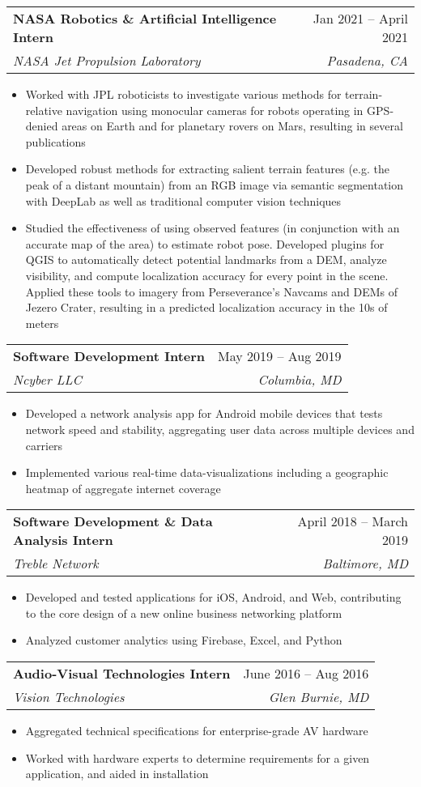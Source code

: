 \documentclass[letterpaper,11pt]{article}
\makeatletter
\newcommand{\resumeItem}[1]{
  \item\small{
    {#1 \vspace{-2pt}}
  }
}
\newcommand{\resumeSubheading}[4]{
  \vspace{-2pt}\item
    \begin{tabular*}{0.97\textwidth}[t]{l@{\extracolsep{\fill}}r}
      \textbf{#1} & #2 \\
      \textit{\small#3} & \textit{\small #4} \\
    \end{tabular*}\vspace{-7pt}
}
\newcommand{\resumeItemListStart}{\begin{itemize}}
\newcommand{\resumeItemListEnd}{\end{itemize}}
\makeatother
\begin{document}
    \resumeSubheading
      {NASA Robotics \& Artificial Intelligence Intern}{Jan 2021 -- April 2021}
      {NASA Jet Propulsion Laboratory}{Pasadena, CA}
      \resumeItemListStart
        \resumeItem{Worked with JPL roboticists to investigate various methods for terrain-relative navigation using monocular cameras for robots operating in GPS-denied areas on Earth and for planetary rovers on Mars, resulting in several publications}
        \resumeItem{Developed robust methods for extracting salient terrain features (e.g. the peak of a distant mountain) from an RGB image via semantic segmentation with DeepLab as well as traditional computer vision techniques}
        \resumeItem{Studied the effectiveness of using observed features (in conjunction with an accurate map of the area) to estimate robot pose. Developed plugins for QGIS to automatically detect potential landmarks from a DEM, analyze visibility, and compute localization accuracy for every point in the scene. Applied these tools to imagery from Perseverance's Navcams and DEMs of Jezero Crater, resulting in a predicted localization accuracy in the 10s of meters}
      \resumeItemListEnd
  
    \resumeSubheading
      {Software Development Intern}{May 2019 -- Aug 2019}
      {Ncyber LLC}{Columbia, MD}
      \resumeItemListStart
        \resumeItem{Developed a network analysis app for Android mobile devices that tests network speed and stability, aggregating user data across multiple devices and carriers}
        \resumeItem{Implemented various real-time data-visualizations including a geographic heatmap of aggregate internet coverage}
      \resumeItemListEnd
      
      \resumeSubheading
      {Software Development \& Data Analysis Intern}{April 2018 -- March 2019}
      {Treble Network}{Baltimore, MD}
      \resumeItemListStart
        \resumeItem{Developed and tested applications for iOS, Android, and Web, contributing to the core design of a new online business networking platform}
        \resumeItem{Analyzed customer analytics using Firebase, Excel, and Python}
      \resumeItemListEnd
      
      \resumeSubheading
      {Audio-Visual Technologies Intern}{June 2016 -- Aug 2016}
      {Vision Technologies}{Glen Burnie, MD}
      \resumeItemListStart
        \resumeItem{Aggregated technical specifications for enterprise-grade AV hardware}
        \resumeItem{Worked with hardware experts to determine requirements for a given application, and aided in installation}
      \resumeItemListEnd
     
\end{document}
